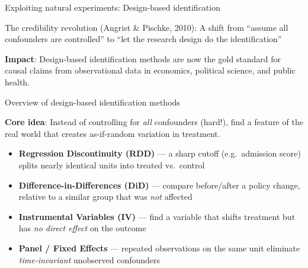 \documentclass[aspectratio=169, 12pt]{beamer}
\newcommand{\redt}[1]{\textcolor{emphred}{#1}}
\begin{document}
\begin{frame}{Exploiting natural experiments: Design-based identification}
\begin{center}
    \end{center}

\vspace{0.5em}
The \redt{credibility revolution} (Angrist \& Pischke, 2010): A shift from ``assume all confounders are controlled'' to ``let the research design do the identification''

\vspace{0.5em}
\textbf{Impact}: Design-based identification methods are now the \redt{gold standard} for causal claims
from observational data in economics, political science, and public health.
\end{frame}

\begin{frame}{Overview of design-based identification methods}

  \textbf{Core idea}: Instead of controlling for \emph{all} confounders (hard!), find a feature
  of the real world that creates \redt{as-if-random} variation in treatment.
  
  \vspace{0.5em}
  \begin{itemize}\setlength\itemsep{0.4em}
    \item \textbf{Regression Discontinuity (RDD)} --- a sharp cutoff (e.g.\ admission score)
      splits nearly identical units into treated vs.\ control
    \item \textbf{Difference-in-Differences (DiD)} --- compare before/after a policy change,
      relative to a similar group that was \emph{not} affected
    \item \textbf{Instrumental Variables (IV)} --- find a variable that shifts treatment
      but has \emph{no direct effect} on the outcome
    \item \textbf{Panel / Fixed Effects} --- repeated observations on the same unit
      eliminate \emph{time-invariant} unobserved confounders
  \end{itemize}
\end{frame}
\end{document}
